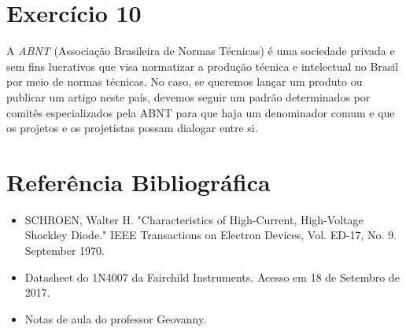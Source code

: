 \documentclass[12pt, a4paper, twoside]{article}
\begin{document}
\section{Exercício 10}

A \textit{ABNT} (Associação Brasileira de Normas Técnicas) é uma sociedade privada e
sem fins lucrativos que visa normatizar a produção técnica e intelectual no Brasil por
meio de normas técnicas. No caso, se queremos lançar um produto ou publicar um artigo
neste país, devemos seguir um padrão determinados por comitês especializados pela ABNT
para que haja um denominador comum e que os projetos e os projetistas possam dialogar
entre si.

\section{Referência Bibliográfica}

\begin{itemize}
    \item SCHROEN, Walter H. "Characteristics of High-Current, High-Voltage Shockley
    Diode." IEEE Transactions on Electron Devices, Vol. ED-17, No. 9. September 1970.
    \item Datasheet do 1N4007 da Fairchild Instruments. Acesso em 18 de Setembro de
    2017.
    \item Notas de aula do professor Geovanny.
\end{itemize}
\end{document}
